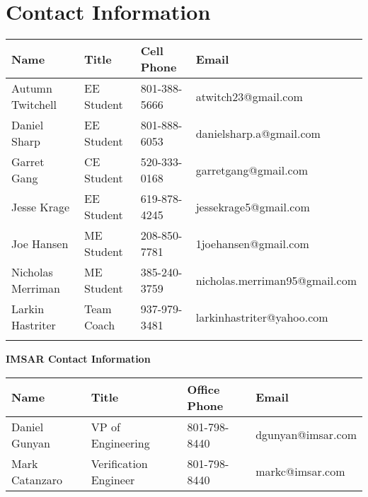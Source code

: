 \begingroup
\makeatletter
\setlength{\@fptop}{0pt}
\setlength{\@fpbot}{0pt plus 1fil}
\makeatother
\begin{table}[p]
{


\chapter{Contact Information}
    \renewcommand{\arraystretch}{1.5}
    \centering
    \begin{tabularx}{1.0\textwidth}{l l l l}
        \hline
        Name & Title & Cell Phone & Email \\
        \hline
        \hline
         Autumn Twitchell & EE Student & 801-388-5666 & atwitch23@gmail.com\\
         Daniel Sharp & EE Student & 801-888-6053 & danielsharp.a@gmail.com \\
        Garret Gang & CE Student & 520-333-0168 & garretgang@gmail.com\\
        Jesse Krage & EE Student & 619-878-4245 & jessekrage5@gmail.com \\
        Joe Hansen & ME Student & 208-850-7781 & 1joehansen@gmail.com \\
        Nicholas Merriman & ME Student & 385-240-3759 & nicholas.merriman95@gmail.com\\
        Larkin Hastriter & Team Coach & 937-979-3481 & larkinhastriter@yahoo.com \\
        \newline
    \end{tabularx}
    {
    \begin{center}
    \textbf{IMSAR Contact Information}
    \end{center}
    }
    \begin{tabularx}{1.0\textwidth}{l l l l}
        \hline
        Name & Title & Office Phone & Email \\
        \hline
        \hline
        Daniel Gunyan & VP of Engineering & 801-798-8440 & dgunyan@imsar.com\\
        Mark Catanzaro & Verification Engineer & 801-798-8440 & markc@imsar.com 
    \end{tabularx}
    }
\end{table}
    \clearpage
\endgroup
